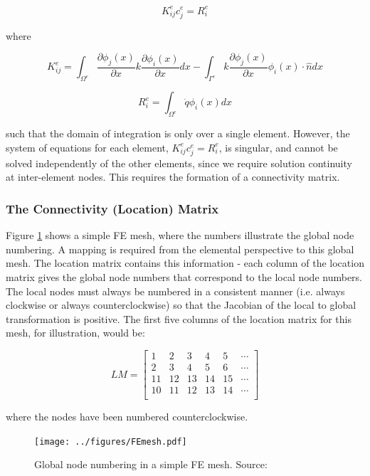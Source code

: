 \documentclass[10pt]{article}
\newcommand{\beq}{\begin{equation}}
\newcommand{\eeq}{\end{equation}}
\begin{document}
\beq
K_{ij}^ec_j^e=R_i^e
\eeq

where

\beq
K_{ij}^e=\int_{\Omega^e}\frac{\partial \phi_j(x)}{\partial x}k\frac{\partial\phi_i(x)}{\partial x}dx-\int_{\Gamma^e}k\frac{\partial \phi_j(x)}{\partial x}\phi_i(x)\cdot\hat{n}dx
\eeq

\beq
R_{i}^e=\int_{\Omega^e}\dot{q}\phi_i(x)dx
\eeq

such that the domain of integration is only over a single element. However, the system of equations for each element, \(K_{ij}^ec_j^e=R_i^e\), is singular, and cannot be solved independently of the other elements, since we require solution continuity at inter-element nodes. This requires the formation of a connectivity matrix.

\subsubsection{The Connectivity (Location) Matrix}
Figure \ref{fig:FEmesh} shows a simple FE mesh, where the numbers illustrate the global node numbering. A mapping is required from the elemental perspective to this global mesh. The location matrix contains this information - each column of the location matrix gives the global node numbers that correspond to the local node numbers. The local nodes must always be numbered in a consistent manner (i.e. always clockwise or always counterclockwise) so that the Jacobian of the local to global transformation is positive. The first five columns of the location matrix for this mesh, for illustration, would be:

\beq
\label{eq:LM}
LM=\begin{bmatrix}
1 & 2 & 3 & 4 & 5 & \cdots\\
2 & 3 & 4 & 5 & 6 & \cdots\\
11 & 12 & 13 & 14 & 15 & \cdots\\
10 & 11 & 12 & 13 & 14 & \cdots\\
\end{bmatrix}
\eeq

where the nodes have been numbered counterclockwise.

\begin{figure}[H]
\centering
\texttt{[image: ../figures/FEmesh.pdf]}
\caption{Global node numbering in a simple FE mesh. Source:}
\label{fig:FEmesh}
\end{figure}
\end{document}
